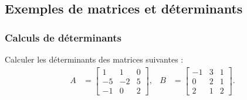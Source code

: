 \subsection{Exemples de matrices et déterminants}%

\subsubsection{Calculs de déterminants}
Calculer les déterminants des matrices suivantes :
\begin{align*}
  A & = \left[\begin{array}{rrr}
    1 & 1 & 0 \\ -5 & -2 & 5 \\ -1 & 0 & 2
    \end{array}\right], &
  B & = \left[\begin{array}{rrr}
    -1 & 3 & 1 \\ 0 & 2 & 1 \\ 2 & 1 & 2
    \end{array}\right].  
\end{align*}


